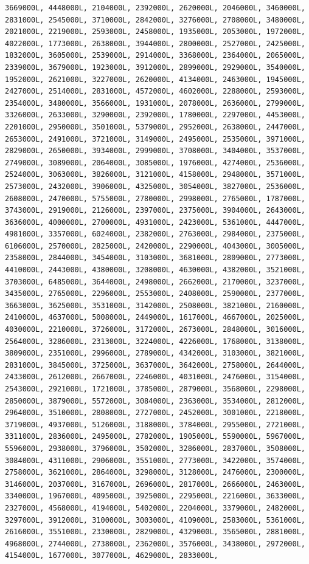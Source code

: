 \documentclass[
]{article}
\begin{document}
\begin{verbatim}
3669000L, 4448000L, 2104000L, 2392000L, 2620000L, 2046000L, 3460000L,  2831000L, 2545000L, 3710000L, 2842000L, 3276000L, 2708000L, 3480000L,  2021000L, 2219000L, 2593000L, 2458000L, 1935000L, 2053000L, 1972000L,  4022000L, 1773000L, 2638000L, 3944000L, 2800000L, 2527000L, 2425000L,  1832000L, 3605000L, 2539000L, 2914000L, 3368000L, 2364000L, 2065000L,  2339000L, 3679000L, 1923000L, 3912000L, 2899000L, 2929000L, 3540000L,  1952000L, 2621000L, 3227000L, 2620000L, 4134000L, 2463000L, 1945000L,  2427000L, 2514000L, 2831000L, 4572000L, 4602000L, 2288000L, 2593000L,  2354000L, 3480000L, 3566000L, 1931000L, 2078000L, 2636000L, 2799000L,  3326000L, 2633000L, 3290000L, 2392000L, 1780000L, 2297000L, 4453000L,  2201000L, 2950000L, 3501000L, 5379000L, 2952000L, 2638000L, 2447000L,  2653000L, 2491000L, 3721000L, 3149000L, 2495000L, 2535000L, 3971000L,  2829000L, 2650000L, 3934000L, 2999000L, 3708000L, 3404000L, 3537000L,  2749000L, 3089000L, 2064000L, 3085000L, 1976000L, 4274000L, 2536000L,  2524000L, 3063000L, 3826000L, 3121000L, 4158000L, 2948000L, 3571000L,  2573000L, 2432000L, 3906000L, 4325000L, 3054000L, 3827000L, 2536000L,  2608000L, 2470000L, 5755000L, 2780000L, 2998000L, 2765000L, 1787000L,  3743000L, 2919000L, 2126000L, 2397000L, 2375000L, 3904000L, 2643000L,  3636000L, 4000000L, 2700000L, 4931000L, 2423000L, 5361000L, 4447000L,  4981000L, 3357000L, 6024000L, 2382000L, 2763000L, 2984000L, 2375000L,  6106000L, 2570000L, 2825000L, 2420000L, 2290000L, 4043000L, 3005000L,  2358000L, 2844000L, 3454000L, 3103000L, 3681000L, 2809000L, 2773000L,  4410000L, 2443000L, 4380000L, 3208000L, 4630000L, 4382000L, 3521000L,  3703000L, 6485000L, 3644000L, 2498000L, 2662000L, 2170000L, 3237000L,  3435000L, 2765000L, 2296000L, 2553000L, 2408000L, 2590000L, 2377000L,  3663000L, 3625000L, 3531000L, 3142000L, 2508000L, 3821000L, 2160000L,  2410000L, 4637000L, 5008000L, 2449000L, 1617000L, 4667000L, 2025000L,  4030000L, 2210000L, 3726000L, 3172000L, 2673000L, 2848000L, 3016000L,  2564000L, 3286000L, 2313000L, 3224000L, 4226000L, 1768000L, 3138000L,  3809000L, 2351000L, 2996000L, 2789000L, 4342000L, 3103000L, 3821000L,  2831000L, 3845000L, 3725000L, 3637000L, 3642000L, 2758000L, 2644000L,  2433000L, 2612000L, 2667000L, 2246000L, 4031000L, 2476000L, 3154000L,  2543000L, 2921000L, 1721000L, 3785000L, 2879000L, 3568000L, 2298000L,  2850000L, 3879000L, 5572000L, 3084000L, 2363000L, 3534000L, 2812000L,  2964000L, 3510000L, 2808000L, 2727000L, 2452000L, 3001000L, 2218000L,  3719000L, 4937000L, 5126000L, 3188000L, 3784000L, 2955000L, 2721000L,  3311000L, 2836000L, 2495000L, 2782000L, 1905000L, 5590000L, 5967000L,  5596000L, 2938000L, 3796000L, 3502000L, 3286000L, 2837000L, 3508000L,  3084000L, 4311000L, 2906000L, 3551000L, 2773000L, 3422000L, 3574000L,  2758000L, 3621000L, 2864000L, 3298000L, 3128000L, 2476000L, 2300000L,  3146000L, 2037000L, 3167000L, 2696000L, 2817000L, 2666000L, 2463000L,  3340000L, 1967000L, 4095000L, 3925000L, 2295000L, 2216000L, 3633000L,  2327000L, 4568000L, 4194000L, 5402000L, 2204000L, 3379000L, 2482000L,  3297000L, 3912000L, 3100000L, 3003000L, 4109000L, 2583000L, 5361000L,  2616000L, 3551000L, 2330000L, 2829000L, 4329000L, 3565000L, 2881000L,  4968000L, 2744000L, 2738000L, 2362000L, 3576000L, 3438000L, 2972000L,  4154000L, 1677000L, 3077000L, 4629000L, 2833000L, 
\end{verbatim}
\end{document}
